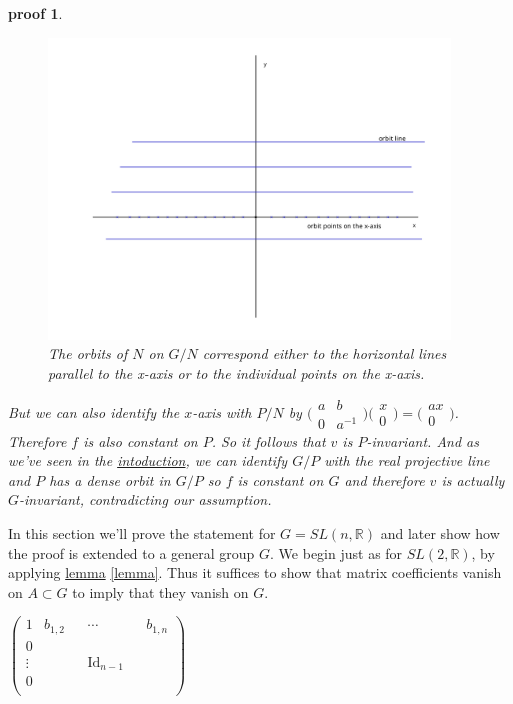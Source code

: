 \documentclass[
  12pt
]{article}
\theoremstyle{break}
\theoremstyle{plain}
\newtheorem*{pf}{proof}
\newcommand{\G}{\ensuremath{G}\xspace}
\newcommand{\sltr}{\ensuremath{SL(2, \mathbb{R})}\xspace}
\newcommand{\slnr}{\ensuremath{SL(n, \mathbb{R})}\xspace}
\newcommand{\ipmatrix}[1]{%
\ensuremath{\big(\begin{smallmatrix} #1 \end{smallmatrix}\big)}\xspace}
\DeclareMathOperator{\Id}{Id}
\begin{document}
\begin{pf}
    \begin{figure}
      \begin{center}
        \includegraphics[width=0.95\textwidth]{N-orbits-in-R2-1.png}
      \end{center}
      \caption{The orbits of $N$ on $G/N$ correspond either to the horizontal lines parallel to the x-axis or to the individual points on the x-axis. }
      \label{fig:n-orbits-in-r2}
    \end{figure}

    But we can also identify the $x$-axis with $P/N$ by $\ipmatrix{a & b \\ 0 &
    a^{-1}}\ipmatrix{x \\ 0} = \ipmatrix{ax \\ 0}$. Therefore $f$ is also
    constant on $P$. So it follows that $v$ is $P$-invariant. And as we've seen
    in the \hyperref[sec:introduction]{intoduction}, we can identify $G/P$ with
    the real projective line and $P$ has a dense orbit in $G/P$ so $f$ is
    constant on $G$ and therefore $v$ is actually \G-invariant, contradicting our
    assumption.
  \end{pf}




  In this section we'll prove the statement for $G = \slnr$ and later show how
  the proof is extended to a general group \G. We begin just as for \sltr, by
  applying \hyperref[lemma]{lemma} \ref{lemma}. Thus it suffices to show that
  matrix coefficients vanish on $A \subset G$ to imply that they vanish on \G.


  \begin{math}
    \begin{pmatrix}
      1 & b_{1,2} & & \cdots & & b_{1,n} \\
      0 & & &  & \\
      \vdots & & & \Id_{n-1} & \\
      0 & & & & \\
    \end{pmatrix}
  \end{math}
\end{document}
